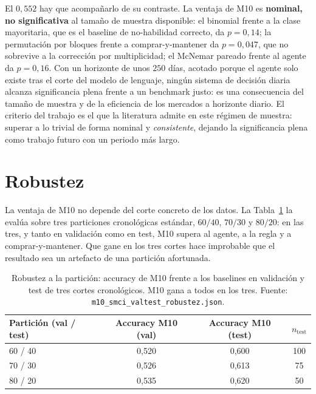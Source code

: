 El $0{,}552$ hay que acompañarlo de su contraste. La ventaja de M10 es \textbf{nominal, no significativa} al tamaño de muestra disponible: el binomial frente a la clase mayoritaria, que es el baseline de no-habilidad correcto, da $p = 0{,}14$; la permutación por bloques frente a comprar-y-mantener da $p = 0{,}047$, que no sobrevive a la corrección por multiplicidad; el McNemar pareado frente al agente da $p = 0{,}16$. Con un horizonte de unos $250$ días, acotado porque el agente solo existe tras el corte del modelo de lenguaje, ningún sistema de decisión diaria alcanza significancia plena frente a un benchmark justo: es una consecuencia del tamaño de muestra y de la eficiencia de los mercados a horizonte diario. El criterio del trabajo es el que la literatura admite en este régimen de muestra: superar a lo trivial de forma nominal y \emph{consistente}, dejando la significancia plena como trabajo futuro con un periodo más largo.

\section{Robustez}
\label{sec:robustez}

La ventaja de M10 no depende del corte concreto de los datos. La Tabla~\ref{tab:smci-robustez} la evalúa sobre tres particiones cronológicas estándar, $60/40$, $70/30$ y $80/20$: en las tres, y tanto en validación como en test, M10 supera al agente, a la regla y a comprar-y-mantener. Que gane en los tres cortes hace improbable que el resultado sea un artefacto de una partición afortunada.


\begin{table}[htbp]
\centering
\caption{Robustez a la partición: accuracy de M10 frente a los baselines en validación y test de tres cortes cronológicos. M10 gana a todos en los tres. Fuente: \texttt{m10\_smci\_valtest\_robustez.json}.}
\label{tab:smci-robustez}
\begin{tabular}{lccc}
\hline
Partición (val / test) & Accuracy M10 (val) & Accuracy M10 (test) & $n_{\text{test}}$ \\
\hline
60 / 40 & 0,520 & 0,600 & 100 \\
70 / 30 & 0,526 & 0,613 & 75 \\
80 / 20 & 0,535 & 0,620 & 50 \\
\hline
\end{tabular}
\end{table}

